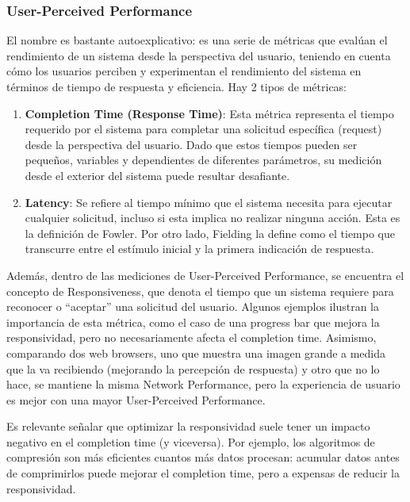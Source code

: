 \documentclass{article}
\begin{document}
 		\subsubsection{User-Perceived Performance}
 		El nombre es bastante autoexplicativo: es una serie de métricas que evalúan el rendimiento de un sistema desde la perspectiva del usuario, teniendo en cuenta cómo los usuarios perciben y experimentan el rendimiento del sistema en términos de tiempo de respuesta y eficiencia.
 		Hay 2 tipos de métricas:
 		
 		
 		\begin{enumerate}
 			\item \textbf{Completion Time (Response Time)}: Esta métrica representa el tiempo requerido por el sistema para completar una solicitud específica (request) desde la perspectiva del usuario. Dado que estos tiempos pueden ser pequeños, variables y dependientes de diferentes parámetros, su medición desde el exterior del sistema puede resultar desafiante.
 			
 			\item \textbf{Latency}: Se refiere al tiempo mínimo que el sistema necesita para ejecutar cualquier solicitud, incluso si esta implica no realizar ninguna acción. Esta es la definición de Fowler. Por otro lado, Fielding la define como el tiempo que transcurre entre el estímulo inicial y la primera indicación de respuesta.
 			
 		\end{enumerate}
 		
 		Además, dentro de las mediciones de User-Perceived Performance, se encuentra el concepto de Responsiveness, que denota el tiempo que un sistema requiere para reconocer o ``aceptar'' una solicitud del usuario. Algunos ejemplos ilustran la importancia de esta métrica, como el caso de una progress bar que mejora la responsividad, pero no necesariamente afecta el completion time. Asimismo, comparando dos web browsers, uno que muestra una imagen grande a medida que la va recibiendo (mejorando la percepción de respuesta) y otro que no lo hace, se mantiene la misma Network Performance, pero la experiencia de usuario es mejor con una mayor User-Perceived Performance.
 		
 		Es relevante señalar que optimizar la responsividad suele tener un impacto negativo en el completion time (y viceversa). Por ejemplo, los algoritmos de compresión son más eficientes cuantos más datos procesan: acumular datos antes de comprimirlos puede mejorar el completion time, pero a expensas de reducir la responsividad.
 		
\end{document}
